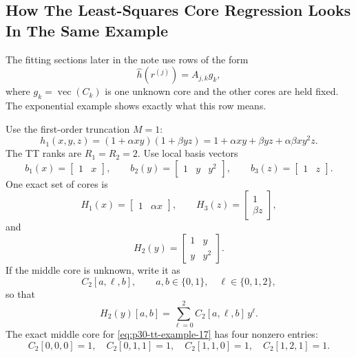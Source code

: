 \documentclass[11pt]{article}
\numberwithin{equation}{section}
\newcommand{\vecop}{\operatorname{vec}}
\begin{document}
\subsection*{How The Least-Squares Core Regression Looks In The Same Example}
\label{subsec:p30-worked-tt-regression}

The fitting sections later in the note use rows of the form
\[
    \widehat h(r^{(j)})=A_{j,k}g_k,
\]
where \(g_k=\vecop(C_k)\) is one unknown core and the other cores are held
fixed.  The exponential example shows exactly what this row means.

Use the first-order truncation \(M=1\):
\begin{equation}
    h_1(x,y,z)
    =
    (1+\alpha xy)(1+\beta yz)
    =
    1+\alpha xy+\beta yz+\alpha\beta xy^2z.
    \label{eq:p30-tt-example-14}
\end{equation}
The TT ranks are \(R_1=R_2=2\).  Use local basis vectors
\begin{equation}
    b_1(x)=\begin{bmatrix}1&x\end{bmatrix},\qquad
    b_2(y)=\begin{bmatrix}1&y&y^2\end{bmatrix},\qquad
    b_3(z)=\begin{bmatrix}1&z\end{bmatrix}.
    \label{eq:p30-tt-example-15}
\end{equation}
One exact set of cores is
\begin{equation}
    H_1(x)=\begin{bmatrix}1&\alpha x\end{bmatrix},
    \qquad
    H_3(z)=\begin{bmatrix}1\\ \beta z\end{bmatrix},
    \label{eq:p30-tt-example-16}
\end{equation}
and
\begin{equation}
    H_2(y)
    =
    \begin{bmatrix}
    1 & y\\
    y & y^2
    \end{bmatrix}.
    \label{eq:p30-tt-example-17}
\end{equation}
If the middle core is unknown, write it as
\[
    C_2[a,\ell,b],
    \qquad
    a,b\in\{0,1\},\quad \ell\in\{0,1,2\},
\]
so that
\begin{equation}
    H_2(y)[a,b]
    =
    \sum_{\ell=0}^{2} C_2[a,\ell,b]\,y^\ell.
    \label{eq:p30-tt-example-18}
\end{equation}
The exact middle core for \eqref{eq:p30-tt-example-17} has four nonzero
entries:
\begin{equation}
    C_2[0,0,0]=1,\quad
    C_2[0,1,1]=1,\quad
    C_2[1,1,0]=1,\quad
    C_2[1,2,1]=1.
    \label{eq:p30-tt-example-19}
\end{equation}
\end{document}
